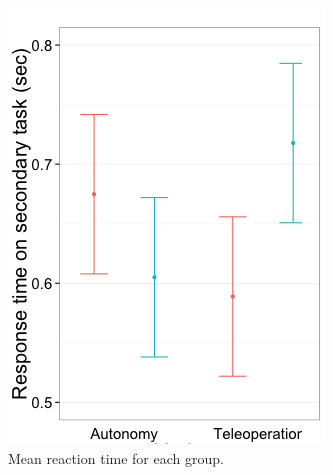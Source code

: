 \documentclass[a4paper,12pt,oneside,openright]{bhamthesis}
\begin{document}
 \begin{figure}
 	\centering
 	\begin{subfigure}[b]{0.4\textwidth}
 		\centering
 		\includegraphics[width=\textwidth]{chapter3_fig/RTs-cropped_pilot.png}
 		\caption{Mean reaction time for each group.}
 		\label{subfig:totalRT_pilot}
 	\end{subfigure}
 	\hfill
 	\begin{subfigure}[b]{0.4\textwidth}
 		\centering

\end{subfigure}
\end{figure}
\end{document}
